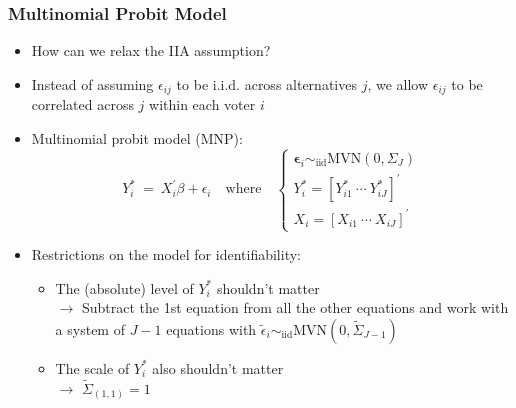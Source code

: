 \documentclass{beamer}
\begin{document}
\begin{frame}
\frametitle{Multinomial Probit Model}
\begin{itemize}
 \item How can we relax the IIA assumption?
\medskip
\pause
  \item Instead of assuming $\epsilon_{ij}$ to be i.i.d. across alternatives $j$,
    we allow $\epsilon_{ij}$ to be correlated across $j$
    within each voter $i$
\medskip
\pause
 \item \alert{Multinomial probit model (MNP)}: \\
   $$ Y_i^\ast \ = \ X_i^{'} \beta + \epsilon_i \quad \text{where}
   \quad \left\{ \begin{array}{l} \boldsymbol{\epsilon}_i \sim_{\text{iid}} \text{MVN}(0, \Sigma_{J}) \\
         Y_i^\ast = [Y_{i1}^\ast \ \cdots \ Y_{iJ}^\ast]^{'} \\
         X_i = \left[ X_{i1} \ \cdots \ X_{iJ}\right]^{'} \end{array}\right. $$

\medskip
\pause
  \item Restrictions on the model for identifiability:
\pause
    \begin{itemize}
      \item The (absolute) \alert{level} of $Y_i^\ast$ shouldn't matter \\ \pause
      $\longrightarrow$ Subtract the 1st equation from
       all the other equations and work with a system of $J-1$
       equations with $\tilde\epsilon_i \sim_{\text{iid}} \text{MVN} (0, \tilde\Sigma_{J-1})$
\pause
      \item The \alert{scale} of $Y_i^\ast$ also shouldn't matter \\ \pause
      $\longrightarrow$ $\tilde\Sigma_{(1,1)} = 1$
    \end{itemize}
\end{itemize}
\end{frame}
\end{document}
